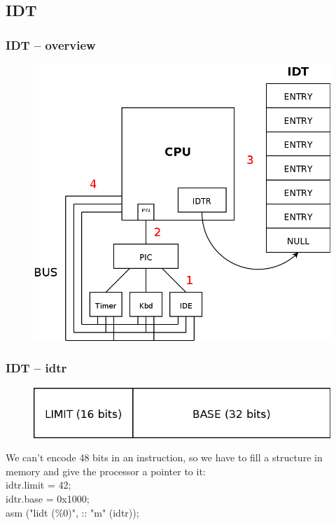 \documentclass{beamer}
\begin{document}
\subsection{IDT}

\begin{frame}
  \frametitle{IDT -- overview}

  \begin{figure}
  \includegraphics[scale=0.2]{idtoverview.png}
  \end{figure}
\end{frame}

\begin{frame}
  \frametitle{IDT -- idtr}

  \begin{figure}
  \includegraphics[scale=0.3]{idtr.png}
  \end{figure}
  We can't encode 48 bits in an instruction, so we have to fill a structure in memory and give the processor a pointer to it:\\
  \vspace{10pt}
  idtr.limit = 42;\\
  idtr.base = 0x1000;\\
  asm ("lidt (\%0)", :: "m" (idtr));
\end{frame}
\end{document}
